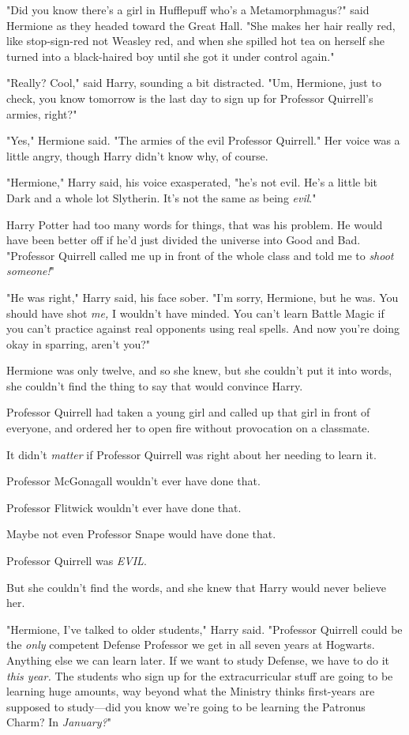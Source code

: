 "Did you know there's a girl in Hufflepuff who's a Metamorphmagus?" said
Hermione as they headed toward the Great Hall. "She makes her hair really red,
like stop-sign-red not Weasley red, and when she spilled hot tea on herself she
turned into a black-haired boy until she got it under control again."

"Really? Cool," said Harry, sounding a bit distracted. "Um, Hermione, just to
check, you know tomorrow is the last day to sign up for Professor Quirrell's
armies, right?"

"Yes," Hermione said. "The armies of the evil Professor Quirrell." Her voice
was a little angry, though Harry didn't know why, of course.

"Hermione," Harry said, his voice exasperated, "he's not evil. He's a little
bit Dark and a whole lot Slytherin. It's not the same as being \emph{evil}."

Harry Potter had too many words for things, that was his problem. He would have
been better off if he'd just divided the universe into Good and Bad. "Professor
Quirrell called me up in front of the whole class and told me to \emph{shoot
someone!}"

"He was right," Harry said, his face sober. "I'm sorry, Hermione, but he was.
You should have shot \emph{me,} I wouldn't have minded. You can't learn Battle
Magic if you can't practice against real opponents using real spells. And now
you're doing okay in sparring, aren't you?"

Hermione was only twelve, and so she knew, but she couldn't put it into words,
she couldn't find the thing to say that would convince Harry.

Professor Quirrell had taken a young girl and called up that girl in front of
everyone, and ordered her to open fire without provocation on a classmate.

It didn't \emph{matter} if Professor Quirrell was right about her needing to
learn it.

Professor McGonagall wouldn't ever have done that.

Professor Flitwick wouldn't ever have done that.

Maybe not even Professor Snape would have done that.

Professor Quirrell was \emph{EVIL}.

But she couldn't find the words, and she knew that Harry would never believe
her.

"Hermione, I've talked to older students," Harry said. "Professor Quirrell
could be the \emph{only} competent Defense Professor we get in all seven years
at Hogwarts. Anything else we can learn later. If we want to study Defense, we
have to do it \emph{this year.} The students who sign up for the
extracurricular stuff are going to be learning huge amounts, way beyond what
the Ministry thinks first-years are supposed to study---did you know we're
going to be learning the Patronus Charm? In \emph{January?}"

